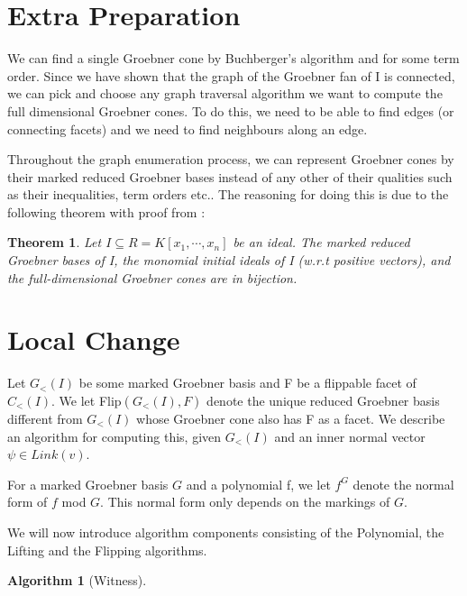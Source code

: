 \documentclass[12pt,a4paper]{report}
\newtheorem{theorem}{Theorem}
\newtheorem{algorithm}{Algorithm}
\begin{document}
\section{Extra Preparation}
We can find a single Groebner cone by Buchberger's algorithm and \cite[Corollary 3.1.10]{AndersPHD} for some term order. Since we have shown that the graph of the Groebner fan of I is connected, we can pick and choose any graph traversal algorithm we want to compute the full dimensional Groebner cones. To do this, we need to be able to find edges (or connecting facets) and we need to find neighbours along an edge.

Throughout the graph enumeration process, we can represent Groebner cones by their marked reduced Groebner bases instead of any other of their qualities such as their inequalities, term orders etc.. The reasoning for doing this is due to the following theorem with proof from \cite[Theorem 4.0.14]{AndersPHD}:

\begin{theorem}
Let $I \subseteq R = K[x_{1}, \cdots, x_{n}]$ be an ideal. The marked reduced Groebner bases of I, the monomial initial ideals of I (w.r.t positive vectors), and the full-dimensional Groebner cones are in bijection.
\end{theorem}

\section{Local Change}

Let $G_{<} (I)$ be some marked Groebner basis and F be a flippable facet of $C_{<} (I)$. We let Flip$(G_{<} (I), F)$ denote the unique reduced Groebner basis different from $G_{<} (I)$ whose Groebner cone also has F as a facet. We describe an algorithm for computing this, given $G_{<} (I)$ and an inner normal vector $ \psi \in Link(v)$.

For a marked Groebner basis $G$ and a polynomial f, we let $f^{G}$ denote the normal form of $f$ mod $G$. This normal form only depends on the markings of $G$.

We will now introduce algorithm components consisting of the Polynomial, the Lifting and the Flipping algorithms.

\begin{algorithm}[Witness]\
 \begin{algorithmic}[1]
    \ENSURE{A polynomial $f \in I$ where $\initial_{v}(f) = g$.}
    \RETURN{$f := g - g^{G_{<} (I)}$;}
\end{algorithmic}
\end{algorithm}
\end{document}
